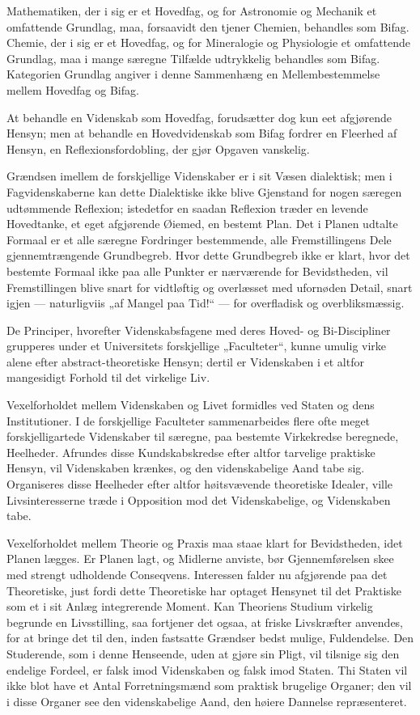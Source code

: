 \documentclass[12pt]{book}
\newcommand{\opage}[1]{\marginnote{\footnotesize\textit{[#1]}}}
\begin{document}
Mathematiken, der i sig er et Hovedfag, og for Astronomie og Mechanik et omfattende
Grundlag, maa, forsaavidt den tjener Chemien, behandles som Bifag. Chemie, der i sig er et
Hovedfag, og for Mineralogie og Physiologie et omfattende Grundlag, maa i mange særegne
Tilfælde udtrykkelig behandles som Bifag. Kategorien Grundlag angiver i denne Sammenhæng en
Mellembestemmelse mellem Hovedfag og Bifag.

At behandle en Videnskab som Hovedfag, forudsætter dog kun eet afgjørende Hensyn; men at
behandle en Hovedvidenskab som Bifag fordrer en Fleerhed af Hensyn, en
Reflexionsfordobling, der gjør Opgaven vanskelig.

Grændsen imellem de forskjellige Videnskaber er i sit Væsen dialektisk; men i
Fagvidenskaberne kan dette Dialektiske ikke blive Gjenstand for nogen særegen udtømmende
Reflexion; istedetfor en saadan Reflexion træder en levende Hovedtanke, et eget afgjørende
Øiemed, en bestemt Plan. Det i Planen udtalte Formaal er et alle særegne Fordringer
bestemmende, alle Fremstillingens Dele gjennemtrængende Grundbegreb. Hvor dette Grundbegreb
ikke er klart, hvor det bestemte Formaal ikke paa alle Punkter er nærværende for
Bevidstheden, vil Fremstillingen blive snart for vidtløftig og overlæsset med ufornøden
Detail, snart igjen — naturligviis „af Mangel paa Tid!“ — for overfladisk og
overbliksmæssig.

De Principer, hvorefter Videnskabsfagene med deres Hoved- og Bi-Discipliner grupperes under
et Universitets
\opage{98} forskjellige „Faculteter“, kunne umulig virke alene efter abstract-theoretiske Hensyn;
dertil er Videnskaben i et altfor mangesidigt Forhold til det virkelige Liv.

Vexelforholdet mellem Videnskaben og Livet formidles ved Staten og dens Institutioner. I de
forskjellige Faculteter sammenarbeides flere ofte meget forskjelligartede Videnskaber til
særegne, paa bestemte Virkekredse beregnede, Heelheder. Afrundes disse Kundskabskredse
efter altfor tarvelige praktiske Hensyn, vil Videnskaben krænkes, og den videnskabelige
Aand tabe sig. Organiseres disse Heelheder efter altfor høitsvævende theoretiske Idealer,
ville Livsinteresserne træde i Opposition mod det Videnskabelige, og Videnskaben tabe.

Vexelforholdet mellem Theorie og Praxis maa staae klart for Bevidstheden, idet Planen
lægges. Er Planen lagt, og Midlerne anviste, bør Gjennemførelsen skee med strengt
udholdende Conseqvens. Interessen falder nu afgjørende paa det Theoretiske, just fordi
dette Theoretiske har optaget Hensynet til det Praktiske som et i sit Anlæg integrerende
Moment. Kan Theoriens Studium virkelig begrunde en Livsstilling, saa fortjener det ogsaa,
at friske Livskræfter anvendes, for at bringe det til den, inden fastsatte Grændser bedst
mulige, Fuldendelse. Den Studerende, som i denne Henseende, uden at gjøre sin Pligt, vil
tilsnige sig den endelige Fordeel, er falsk imod Videnskaben og falsk imod Staten. Thi
Staten vil ikke blot have et Antal Forretningsmænd som praktisk brugelige Organer; den vil
i disse Organer see den videnskabelige Aand, den høiere Dannelse repræsenteret.
\end{document}
